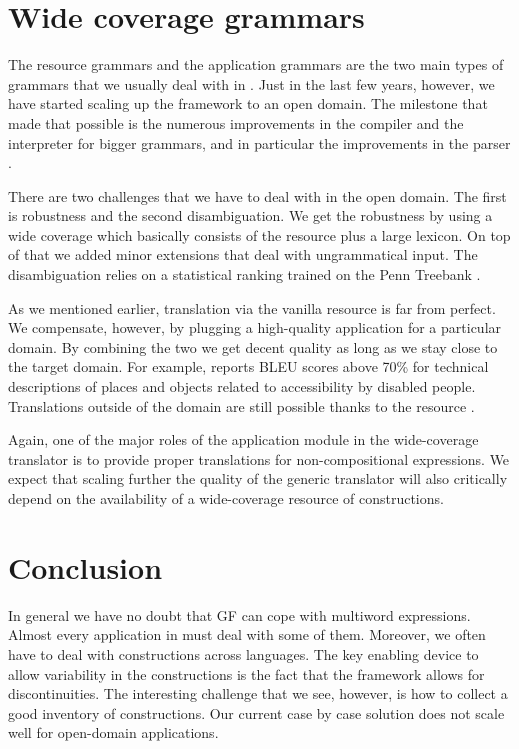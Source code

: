 \documentclass[output=paper]{langsci/langscibook}
\begin{document}
\section{Wide coverage grammars} 

The resource grammars and the application grammars are the two main
types of grammars that we usually deal with in . Just in the last
few years, however, we have started scaling up the framework to 
an open domain. The milestone that made that possible is the numerous
improvements in the compiler and the interpreter for bigger grammars, and in particular the improvements in the  parser \citep{angelov2011mechanics}.

There are two challenges that we have to deal with in the open domain.
The first is robustness and the second disambiguation. We get the robustness
by using a wide coverage  which basically consists of 
the resource  plus a large lexicon. On top of that we added
minor extensions that deal with ungrammatical input. The disambiguation
relies on a statistical ranking trained on the Penn Treebank \citep{angelov2011mechanics}.

As we mentioned earlier, translation via the vanilla resource 
is far from perfect. We compensate, however, by plugging a high-quality
application  for a particular domain. By combining the two
we get decent quality as long as we stay close to the target domain.
For example, \cite{ranta2015grammar} reports BLEU scores above 70\%
for technical descriptions of places and objects related to accessibility
by disabled people.
Translations outside of the domain are still possible thanks to the
resource . 

Again, one of the major roles of the application module in 
the wide-coverage translator is to provide proper translations
for non-compositional expressions. We expect that scaling 
further the quality of the generic translator will also critically
depend on the availability of a wide-coverage resource of constructions.

\section{Conclusion}

In general we have no doubt that GF can cope
with multiword expressions. Almost every application  in 
must deal with some of them. Moreover, we often have to deal with
constructions across languages. The key enabling device to allow
variability in the constructions is the fact that the framework
allows for discontinuities. The interesting challenge that we see,
however, is how to collect a good inventory of constructions.
Our current case by case solution does not scale well for open-domain
applications.


\printbibliography[heading=subbibliography,notkeyword=this]
\end{document}
